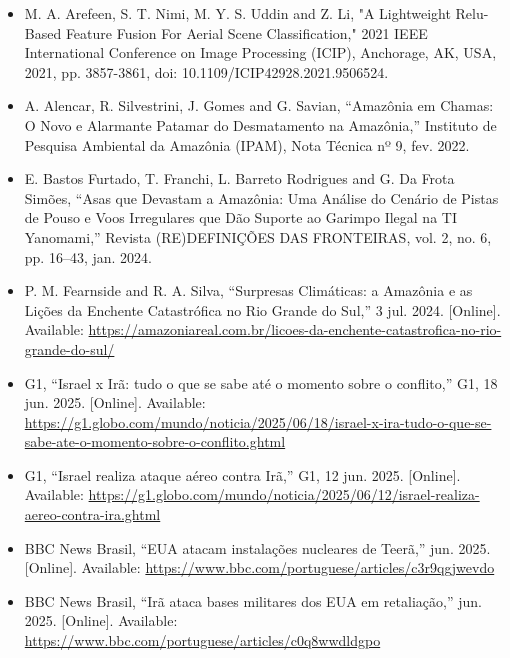 \begin{itemize}
    \item M. A. Arefeen, S. T. Nimi, M. Y. S. Uddin and Z. Li, "A Lightweight Relu-Based Feature Fusion For Aerial Scene Classification," 2021 IEEE International Conference on Image Processing (ICIP), Anchorage, AK, USA, 2021, pp. 3857-3861, doi: 10.1109/ICIP42928.2021.9506524.

    \item A. Alencar, R. Silvestrini, J. Gomes and G. Savian, “Amazônia em Chamas: O Novo e Alarmante Patamar do Desmatamento na Amazônia,”  Instituto de Pesquisa Ambiental da Amazônia (IPAM), Nota Técnica nº 9, fev. 2022.

    \item E. Bastos Furtado, T. Franchi, L. Barreto Rodrigues and G. Da Frota Simões, “Asas que Devastam a Amazônia: Uma Análise do Cenário de Pistas de Pouso e Voos Irregulares que Dão Suporte ao Garimpo Ilegal na TI Yanomami,”  Revista (RE)DEFINIÇÕES DAS FRONTEIRAS, vol. 2, no. 6, pp. 16–43, jan. 2024.

    \item P. M. Fearnside and R. A. Silva, “Surpresas Climáticas: a Amazônia e as Lições da Enchente Catastrófica no Rio Grande do Sul,”  3 jul. 2024. [Online]. Available: \url{https://amazoniareal.com.br/licoes-da-enchente-catastrofica-no-rio-grande-do-sul/}
    
    \item G1, “Israel x Irã: tudo o que se sabe até o momento sobre o conflito,”  G1, 18 jun. 2025. [Online]. Available: \url{https://g1.globo.com/mundo/noticia/2025/06/18/israel-x-ira-tudo-o-que-se-sabe-ate-o-momento-sobre-o-conflito.ghtml}

    \item G1, “Israel realiza ataque aéreo contra Irã,”  G1, 12 jun. 2025. [Online]. Available: \url{https://g1.globo.com/mundo/noticia/2025/06/12/israel-realiza-aereo-contra-ira.ghtml}

    \item BBC News Brasil,  “EUA atacam instalações nucleares de Teerã,”  jun. 2025. [Online]. Available: \url{https://www.bbc.com/portuguese/articles/c3r9qgjwevdo}

    \item BBC News Brasil,  “Irã ataca bases militares dos EUA em retaliação,”  jun. 2025. [Online]. Available: \url{https://www.bbc.com/portuguese/articles/c0q8wwdldgpo}
\end{itemize}